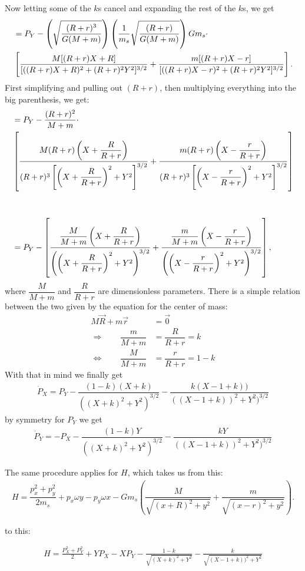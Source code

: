 Now letting some of the $k$s cancel and expanding the rest of the $k$s, we get
\begin{align}
\notag &= P_Y - \left(\sqrt{\dfrac{(R+r)^3}{G(M+m)}}\right) \left(\dfrac{1}{m_s} \sqrt{\dfrac{(R+r)}{G(M+m)}}\right) G m_s \cdot \\
&\left[\dfrac{M[(R+r) X + R]}{[((R+r) X + R)^2 + (R+r)^2 Y^2]^{3/2}} + \dfrac{m[(R+r) X - r]}{[((R+r) X - r)^2 + (R+r)^2 Y^2]^{3/2}} \right].
\end{align}
First simplifying and pulling out $(R+r)$, then multiplying everything into the big parenthesis, we get:
\begin{align}
\notag &= P_Y - \dfrac{(R+r)^2}{M+m} \cdot \\ 
&\left[\dfrac{M(R+r)\left(X + \dfrac{R}{R+r}\right)}{(R+r)^3\left[\left(X + \dfrac{R}{R+r}\right)^2 + Y^2\right]^{3/2}} + \dfrac{m (R+r)\left(X - \dfrac{r}{R+r}\right)}{(R+r)^3\left[\left(X - \dfrac{r}{R+r}\right)^2 + Y^2\right]^{3/2}} \right] \\[1cm]
&= P_Y - \left[\dfrac{\dfrac{M}{M+m}\left(X + \dfrac{R}{R+r}\right)}{\left(\left(X + \dfrac{R}{R+r}\right)^2 + Y^2\right)^{3/2}} + \dfrac{\dfrac{m}{M+m} \left(X - \dfrac{r}{R+r}\right)}{\left(\left(X - \dfrac{r}{R+r}\right)^2 + Y^2\right)^{3/2}} \right] ,
\end{align}
where $\dfrac{M}{M+m}$ and $\dfrac{R}{R+r}$ are dimensionless parameters. There is a simple relation between the two given by the equation for the center of mass:
\begin{align}
M\vec{R} + m\vec{r} &= \vec{0} \\[0.5cm]
\Rightarrow \qquad \dfrac{m}{M+m} &= \dfrac{R}{R+r} = k \\[0.5cm]
\Leftrightarrow \qquad \dfrac{M}{M+m} &= \dfrac{r}{R+r} = 1-k  
\end{align}
With that in mind we finally get
\begin{align}
\dot{P}_X = P_Y - \dfrac{(1-k)(X+k)}{((X+k)^2+Y^2)^{3/2}} - \dfrac{k(X-1+k))}{((X-1+k))^2+Y^2)^{3/2}}
\end{align}
by symmetry for $P_Y$ we get
\begin{align}
\dot{P}_Y = -P_X - \dfrac{(1-k)Y}{((X+k)^2+Y^2)^{3/2}} - \dfrac{k Y}{((X-1+k))^2+Y^2)^{3/2}}
\end{align}

The same procedure applies for $H$, which takes us from this:
\begin{align}
    H = \dfrac{p_x^2 + p_y^2}{2 m_s} + p_x\omega y - p_y\omega x - G m_s \left(\dfrac{M}{\sqrt{(x+R)^2+y^2}} + \dfrac{m}{\sqrt{(x-r)^2+y^2}}\right).
\end{align}

to this:

\begin{align}
    H = \frac{P_X^2 + P_Y^2}{2} + Y P_X - X P_Y - \frac{1 -k}{\sqrt{(X+k)^2 + Y^2 }} - \frac{k}{\sqrt{(X-1+k))^2 + Y^2}}
\end{align}
